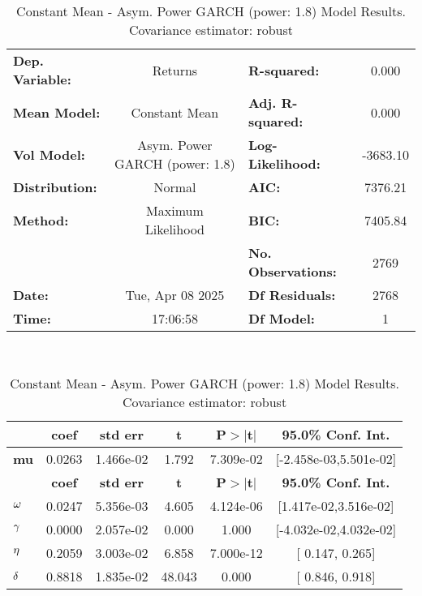 \begin{table}
    \centering
    \renewcommand*{\arraystretch}{1.2}
    \begin{tabular}{lc|lc}
        \hline
        \textbf{Dep. Variable:} &            Returns             & \textbf{  R-squared:         } &     0.000   \\
        \textbf{Mean Model:}    &         Constant Mean          & \textbf{  Adj. R-squared:    } &     0.000   \\
        \textbf{Vol Model:}     & Asym. Power GARCH (power: 1.8) & \textbf{  Log-Likelihood:    } &   -3683.10  \\
        \textbf{Distribution:}  &             Normal             & \textbf{  AIC:               } &    7376.21  \\
        \textbf{Method:}        &       Maximum Likelihood       & \textbf{  BIC:               } &    7405.84  \\
        \textbf{}               &                                & \textbf{  No. Observations:  } &    2769     \\
        \textbf{Date:}          &        Tue, Apr 08 2025        & \textbf{  Df Residuals:      } &    2768     \\
        \textbf{Time:}          &            17:06:58            & \textbf{  Df Model:          } &     1       \\
        \hline
    \end{tabular}
     \vspace{0.5cm} \\
    \begin{tabular}{lccccc}
                    & \textbf{coef} & \textbf{std err} & \textbf{t} & \textbf{P$> |$t$|$} & \textbf{95.0\% Conf. Int.}  \\
        \hline
        \textbf{mu} &       0.0263  &    1.466e-02     &     1.792  &      7.309e-02       &   [-2.458e-03,5.501e-02]    \\
                          & \textbf{coef} & \textbf{std err} & \textbf{t} & \textbf{P$> |$t$|$} & \textbf{95.0\% Conf. Int.}  \\
        \hline
        $\bf{\omega} $   &       0.0247  &    5.356e-03     &     4.605  &      4.124e-06       &   [1.417e-02,3.516e-02]     \\
        $\bf{\gamma}$ &     0.0000    &    2.057e-02     &   0.000    &          1.000       &   [-4.032e-02,4.032e-02]    \\
        $\bf{\eta}$ &       0.2059  &    3.003e-02     &     6.858  &      7.000e-12       &     [  0.147,  0.265]       \\
        $\bf{\delta}$  &       0.8818  &    1.835e-02     &    48.043  &        0.000         &     [  0.846,  0.918]       \\
        \hline
    \end{tabular}
    \\
    \caption{Constant Mean - Asym. Power GARCH (power: 1.8) Model Results. Covariance estimator: robust}
    \label{tab:garch}
\end{table}

